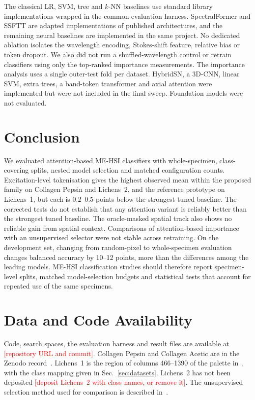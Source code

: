 \documentclass[journal]{IEEEtran}
\newcommand{\RESULT}[1]{\textcolor{red}{[#1]}}
\begin{document}
The classical LR, SVM, tree and $k$-NN baselines use standard library implementations wrapped in the common evaluation harness. SpectralFormer and SSFTT are adapted implementations of published architectures, and the remaining neural baselines are implemented in the same project. No dedicated ablation isolates the wavelength encoding, Stokes-shift feature, relative bias or token dropout. We also did not run a shuffled-wavelength control or retrain classifiers using only the top-ranked importance measurements. The importance analysis uses a single outer-test fold per dataset. HybridSN, a 3D-CNN, linear SVM, extra trees, a band-token transformer and axial attention were implemented but were not included in the final sweep. Foundation models were not evaluated.

\section{Conclusion}
We evaluated attention-based ME-HSI classifiers with whole-specimen, class-covering splits, nested model selection and matched configuration counts. Excitation-level tokenisation gives the highest observed mean within the proposed family on Collagen Pepsin and Lichens~2, and the reference prototype on Lichens~1, but each is 0.2--0.5 points below the strongest tuned baseline. The corrected tests do not establish that any attention variant is reliably better than the strongest tuned baseline. The oracle-masked spatial track also shows no reliable gain from spatial context. Comparisons of attention-based importance with an unsupervised selector were not stable across retraining. On the development set, changing from random-pixel to whole-specimen evaluation changes balanced accuracy by 10--12 points, more than the differences among the leading models. ME-HSI classification studies should therefore report specimen-level splits, matched model-selection budgets and statistical tests that account for repeated use of the same specimens.

\section*{Data and Code Availability}
Code, search spaces, the evaluation harness and result files are available at \RESULT{repository URL and commit}. Collagen Pepsin and Collagen Acetic are in the Zenodo record~\cite{zenodo_collagen}. Lichens~1 is the region of columns 466--1390 of the palette in~\cite{zenodo_lichens}, with the class mapping given in Sec.~\ref{sec:datasets}. Lichens~2 has not been deposited \RESULT{deposit Lichens~2 with class names, or remove it}. The unsupervised selection method used for comparison is described in~\cite{meloyan2026unsupervised}.



\end{document}
